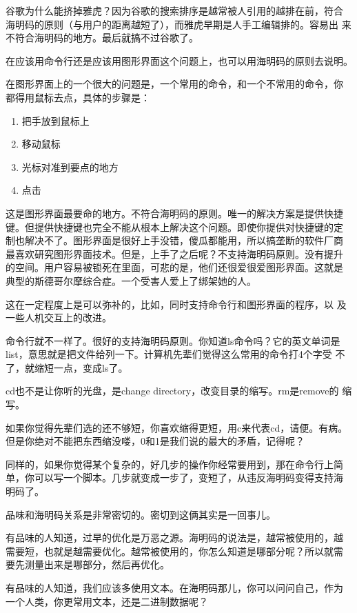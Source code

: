 \documentclass[10pt]{article}
\begin{document}
\begin{CJK*}{UTF8}{simsun}
谷歌为什么能挤掉雅虎？因为谷歌的搜索排序是越常被人引用的越排在前，符合
海明码的原则（与用户的距离越短了），而雅虎早期是人手工编辑排的。容易出
来不符合海明码的地方。最后就搞不过谷歌了。

在应该用命令行还是应该用图形界面这个问题上，也可以用海明码的原则去说明。

在图形界面上的一个很大的问题是，一个常用的命令，和一个不常用的命令，你
都得用鼠标去点，具体的步骤是：

\begin{enumerate}
\item 把手放到鼠标上
\item 移动鼠标
\item 光标对准到要点的地方
\item 点击
\end{enumerate}

这是图形界面最要命的地方。不符合海明码的原则。唯一的解决方案是提供快捷
键。但提供快捷键也完全不能从根本上解决这个问题。即使你提供对快捷键的定
制也解决不了。图形界面是很好上手没错，傻瓜都能用，所以搞垄断的软件厂商
最喜欢研究图形界面技术。但是，上手了之后呢？不支持海明码原则。没有提升
的空间。用户容易被锁死在里面，可悲的是，他们还很爱很爱图形界面。这就是
典型的斯德哥尔摩综合症。一个受害人爱上了绑架她的人。

这在一定程度上是可以弥补的，比如，同时支持命令行和图形界面的程序，以
及一些人机交互上的改进。

命令行就不一样了。很好的支持海明码原则。你知道ls命令吗？它的英文单词是
list，意思就是把文件给列一下。计算机先辈们觉得这么常用的命令打4个字受
不了，就缩短一点，变成ls了。

cd也不是让你听的光盘，是change directory，改变目录的缩写。rm是remove的
缩写。

如果你觉得先辈们选的还不够短，你喜欢缩得更短，用c来代表cd，请便。有病。
但是你绝对不能把东西缩没喽，0和1是我们说的最大的矛盾，记得呢？

同样的，如果你觉得某个复杂的，好几步的操作你经常要用到，那在命令行上简
单，你可以写一个脚本。几步就变成一步了，变短了，从违反海明码变得支持海
明码了。

品味和海明码关系是非常密切的。密切到这俩其实是一回事儿。

有品味的人知道，过早的优化是万恶之源。海明码的说法是，越常被使用的，越
需要短，也就是越需要优化。越常被使用的，你怎么知道是哪部分呢？所以就需
要先测量出来是哪部分，然后再优化。

有品味的人知道，我们应该多使用文本。在海明码那儿，你可以问问自己，作为
一个人类，你更常用文本，还是二进制数据呢？


\end{CJK*}
\end{document}
